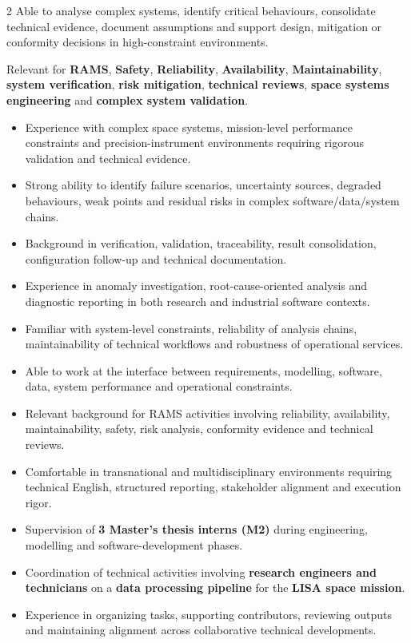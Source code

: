 \documentclass[8pt,a4paper,ragged2e,withhyper]{altacv}
\begin{document}
\begin{paracol}{2}
Able to analyse complex systems, identify critical behaviours, consolidate technical evidence, document assumptions and support design, mitigation or conformity decisions in high-constraint environments.

Relevant for \textbf{RAMS}, \textbf{Safety}, \textbf{Reliability}, \textbf{Availability}, \textbf{Maintainability}, \textbf{system verification}, \textbf{risk mitigation}, \textbf{technical reviews}, \textbf{space systems engineering} and \textbf{complex system validation}.


\begin{itemize}
  \item Experience with complex space systems, mission-level performance constraints and precision-instrument environments requiring rigorous validation and technical evidence.
  \item Strong ability to identify failure scenarios, uncertainty sources, degraded behaviours, weak points and residual risks in complex software/data/system chains.
  \item Background in verification, validation, traceability, result consolidation, configuration follow-up and technical documentation.
  \item Experience in anomaly investigation, root-cause-oriented analysis and diagnostic reporting in both research and industrial software contexts.
  \item Familiar with system-level constraints, reliability of analysis chains, maintainability of technical workflows and robustness of operational services.
  \item Able to work at the interface between requirements, modelling, software, data, system performance and operational constraints.
  \item Relevant background for RAMS activities involving reliability, availability, maintainability, safety, risk analysis, conformity evidence and technical reviews.
  \item Comfortable in transnational and multidisciplinary environments requiring technical English, structured reporting, stakeholder alignment and execution rigor.
\end{itemize}


\begin{itemize}
  \item Supervision of \textbf{3 Master's thesis interns (M2)} during engineering, modelling and software-development phases.
  \item Coordination of technical activities involving \textbf{research engineers and technicians} on a \textbf{data processing pipeline} for the \textbf{LISA space mission}.
  \item Experience in organizing tasks, supporting contributors, reviewing outputs and maintaining alignment across collaborative technical developments.
\end{itemize}


\end{paracol}
\end{document}
